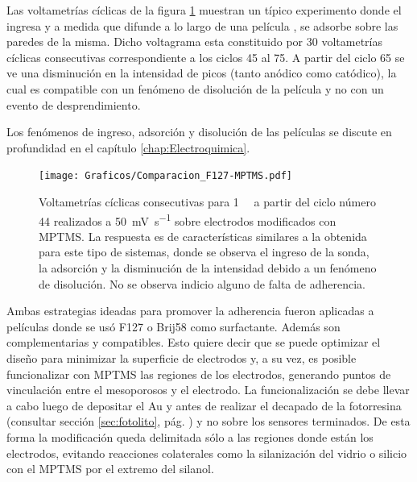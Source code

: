              Las voltametrías cíclicas de la figura \ref{fig:comparaciones_MPTMS-B} muestran un típico experimento donde el \aminorutenio\space ingresa y a medida que difunde a lo largo de una película \pdmF, se adsorbe sobre las paredes de la misma. Dicho voltagrama esta constituido por 30 voltametrías cíclicas consecutivas correspondiente a los ciclos 45 al 75. A partir del ciclo 65 se ve una disminución en la intensidad de picos (tanto anódico como catódico), la cual es compatible con un fenómeno de disolución de la película y no con un evento de desprendimiento. 

             Los fenómenos de ingreso, adsorción y disolución de las películas se discute en profundidad en el capítulo \ref{chap:Electroquimica}.
       	
					\begin{figure}[!ht]
							\begin{center}
				 	   	    \texttt{[image: Graficos/Comparacion\_F127-MPTMS.pdf]}
				       		\caption[Comparación de superficies con y sin MPTMS.]{Voltametrías cíclicas consecutivas para \aminorutenio\space \SI{1}{\milli\Molar} a partir del ciclo número 44 realizados a \SI{50}{\milli\volt.\second^{-1}} sobre electrodos modificados con MPTMS. La respuesta es de características similares a la obtenida para este tipo de sistemas, donde se observa el ingreso de la sonda, la adsorción y la disminución de la intensidad debido a un fenómeno de disolución. No se observa indicio alguno de falta de adherencia.}
						 \label{fig:comparaciones_MPTMS-B}	
					    \end{center}
					    \end{figure}
		
			 Ambas estrategias ideadas para promover la adherencia fueron aplicadas a películas donde se usó F127 o Brij58 como surfactante. Además son complementarias y compatibles. Esto quiere decir que se puede optimizar el diseño para minimizar la superficie de electrodos y, a su vez, es posible funcionalizar con MPTMS las regiones de los electrodos, generando puntos de vinculación entre el mesoporosos y el electrodo. La funcionalización se debe llevar a cabo luego de depositar el Au y antes de realizar el decapado de la fotorresina (consultar sección \ref{sec:fotolito}, pág. \pageref{sec:fotolito}) y no sobre los sensores terminados. De esta forma la modificación queda delimitada sólo a las regiones donde están los electrodos, evitando reacciones colaterales como la silanización del vidrio o silicio con el MPTMS por el extremo del silanol.

